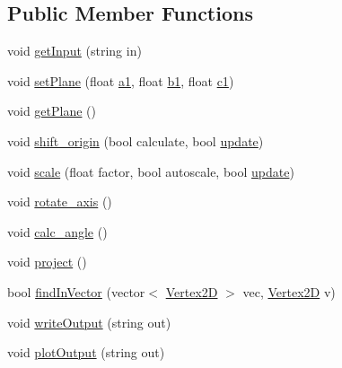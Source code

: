 \subsection*{Public Member Functions}
\begin{DoxyCompactItemize}
\item 
void \hyperlink{class_three___to___two_ab3a3cda1a3f0e61b927c87e0a9655de6}{get\+Input} (string in)
\item 
void \hyperlink{class_three___to___two_a879354b0418511bd700d3f19c3cf8cbc}{set\+Plane} (float \hyperlink{draw2_8cpp_ad36c8f7a507294aa8f53bb0baf28fb24}{a1}, float \hyperlink{draw2_8cpp_a0a909289ec9fbfaa70c0e112ec9e3b15}{b1}, float \hyperlink{draw2_8cpp_a7fea4d2f6f3c31b60301494b136558af}{c1})
\item 
void \hyperlink{class_three___to___two_a00c909f873cde40038e9e077f9349162}{get\+Plane} ()
\item 
void \hyperlink{class_three___to___two_afcfa094efbefe5fc2c68129f0019328c}{shift\+\_\+origin} (bool calculate, bool \hyperlink{draw2_8cpp_ac5c54df7ed3b930268c8d7752c101725}{update})
\item 
void \hyperlink{class_three___to___two_aa783af2e5ff93ec80cb54bd9d70596ce}{scale} (float factor, bool autoscale, bool \hyperlink{draw2_8cpp_ac5c54df7ed3b930268c8d7752c101725}{update})
\item 
void \hyperlink{class_three___to___two_a741076f262ae512cca81ecff5f6f6b3b}{rotate\+\_\+axis} ()
\item 
void \hyperlink{class_three___to___two_ac3b4d37a5184425e327ff0ec0754ced6}{calc\+\_\+angle} ()
\item 
void \hyperlink{class_three___to___two_aee13f1c088479d2c414da9cbb25d7c65}{project} ()
\item 
bool \hyperlink{class_three___to___two_aa0a2e58b081bb7079b094c0b8ab974cc}{find\+In\+Vector} (vector$<$ \hyperlink{struct_vertex2_d}{Vertex2D} $>$ vec, \hyperlink{struct_vertex2_d}{Vertex2D} v)
\item 
void \hyperlink{class_three___to___two_a4b6515193b0bf2798ef792c0fc2998f4}{write\+Output} (string out)
\item 
void \hyperlink{class_three___to___two_ab630fa931ae0d5f46da926ad18e831f6}{plot\+Output} (string out)
\end{DoxyCompactItemize}
